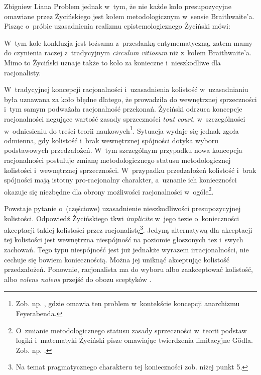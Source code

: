 \begin{artplenv}{Zbigniew Liana}
Problem jednak w~tym, że nie każde koło presupozycyjne omawiane przez Życińskiego jest kołem metodologicznym w~sensie Braith\-waite'a. Pisząc o~próbie uzasadnienia realizmu epistemologicznego Życiński mówi:

W~tym kole konkluzja jest tożsama z~przesłanką entymematyczną, zatem mamy do czynienia raczej z~tradycyjnym \textit{circulum vitiosum} niż z~kołem Braithwaite'a. Mimo to Życiński uznaje także to koło za konieczne i~nieszkodliwe dla racjonalisty.

W~tradycyjnej koncepcji racjonalności i~uzasadnienia kolistość w~uzasadnianiu była uznawana za koło błędne dlatego, że prowadziła do wewnętrznej sprzeczności i~tym samym podważała racjonalność przekonań. Życiński odrzuca koncepcje racjonalności negujące wartość zasady sprzeczności \textit{tout court}, w~szczególności w~odniesieniu do treści teorii naukowych\footnote{Zob. np.
\parencites[][s.~218n]{zycinski_elementy_1996}[][s.~297n]{zycinski_elementy_2015}, %
 gdzie omawia ten problem w~kontekście koncepcji anarchizmu Feyerabenda.}. Sytuacja wydaje się jednak zgoła odmienna, gdy kolistość i~brak wewnętrznej spójności dotyka wyboru podstawowych przedzałożeń. W~tym szczególnym przypadku nowa koncepcja racjonalności postuluje zmianę metodologicznego statusu metodologicznej kolistości i~wewnętrznej sprzeczności. W~przypadku przedzałożeń kolistość i~brak spójności mają istotny pro-racjonalny charakter, a~uznanie ich konieczności okazuje się niezbędne dla obrony możliwości racjonalności w~ogóle\footnote{O~zmianie metodologicznego statusu zasady sprzeczności w~teorii podstaw logiki i~matematyki Życiński pisze omawiając twierdzenia limitacyjne Gödla. Zob. np. 
\parencites[][s.~196]{zycinski_teizm_1985}[][s.~131n]{zycinski_structure_1988}[][s.~231nn]{zycinski_struktura_2013_liana}[][s.~266n]{zycinski_elementy_1996}[][s.~360nn]{zycinski_elementy_2015}.%
}.

Powstaje pytanie o~(częściowe) uzasadnienie nieszkodliwości presupozycyjnej kolistości. Odpowiedź Życińskiego tkwi \textit{implicite} w~jego tezie o~konieczności akceptacji takiej kolistości przez racjonalistę\footnote{Na temat pragmatycznego charakteru tej konieczności zob. niżej punkt 5.}. Jedyną alternatywą dla akceptacji tej kolistości jest wewnętrzna niespójność na poziomie głoszonych tez i~swych zachowań. Tego typu niespójność jest już jednakże wyrazem irracjonalności, nie cechuje się bowiem koniecznością. Można jej uniknąć akceptując kolistość przedzałożeń. Ponownie, racjonalista ma do wyboru albo zaakceptować kolistość, albo \textit{volens nolens} przejść do obozu sceptyków
\parencite[][s.~165]{zycinski_teizm_1985}.%



\end{artplenv}
